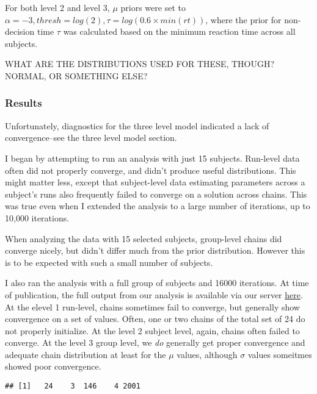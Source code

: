 \documentclass[]{article}
\begin{document}
For both level 2 and level 3, \(\mu\) priors were set to
\(\alpha=-3, thresh=log(2), \tau=log(0.6\times min(rt))\), where the
prior for non-decision time \(\tau\) was calculated based on the minimum
reaction time across all subjects.

WHAT ARE THE DISTRIBUTIONS USED FOR THESE, THOUGH? NORMAL, OR SOMETHING
ELSE?

\subsubsection{Results}\label{results-1}

Unfortunately, diagnostics for the three level model indicated a lack of
convergence--see the three level model section.

I began by attempting to run an analysis with just 15 subjects.
Run-level data often did not properly converge, and didn't produce
useful distributions. This might matter less, except that subject-level
data estimating parameters across a subject's runs also frequently
failed to converge on a solution across chains. This was true even when
I extended the analysis to a large number of iterations, up to 10,000
iterations.

When analyzing the data with 15 selected subjects, group-level chains
did converge nicely, but didn't differ much from the prior distribution.
However this is to be expected with such a small number of subjects.

I also ran the analysis with a full group of subjects and 16000
iterations. At time of publication, the full output from our analysis is
available via our server
\href{http://msm.fmri.cn/expdata/bensmith/joint-modeling/data/msm/reversallearning/de_mcmc/output_h_m5j20180528T121720.pdf}{here}.
At the elevel 1 run-level, chains sometimes fail to converge, but
generally show convergence on a set of values. Often, one or two chains
of the total set of 24 do not properly initialize. At the level 2
subject level, again, chains often failed to converge. At the level 3
group level, we \emph{do} generally get proper convergence and adequate
chain distribution at least for the \(\mu\) values, although \(\sigma\)
values someitmes showed poor convergence.

\begin{verbatim}
## [1]   24    3  146    4 2001
\end{verbatim}
\end{document}
